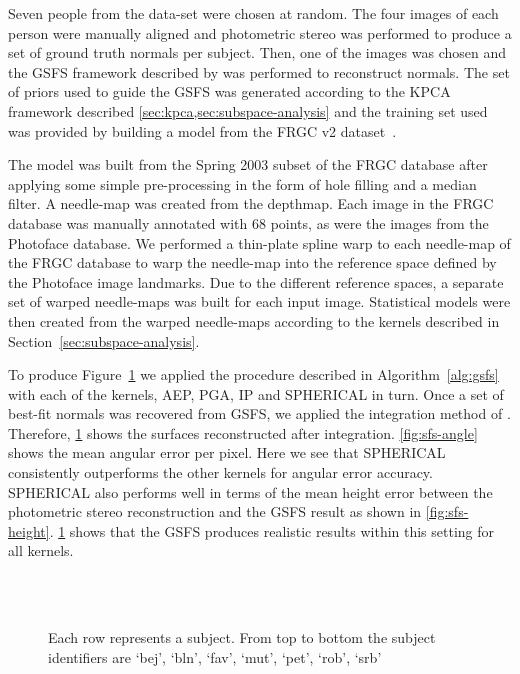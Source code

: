 Seven people from the data-set were chosen at random. The four images of each 
person were manually aligned and photometric stereo was performed to produce a
set of ground truth normals per subject. Then, one of the images was chosen 
and the GSFS framework described by \citet{RefWorks:86,RefWorks:90} 
was performed to reconstruct normals. The set of priors used to guide the GSFS 
was generated according to the KPCA framework described 
\cref{sec:kpca,sec:subspace-analysis} and the training set used was provided by 
building a model from the FRGC v2 dataset~\cite{RefWorks:251}.

The model was built from the Spring 2003 subset of the FRGC database after 
applying some simple pre-processing in the form of hole filling and a median 
filter. A needle-map was created from the depthmap. Each image in the FRGC 
database was manually annotated with 68 points, as were the images from the 
Photoface database. We performed a thin-plate spline warp to each needle-map 
of the FRGC database to warp the needle-map into the reference space defined 
by the Photoface image landmarks. Due to the different reference spaces, a 
separate set of warped needle-maps was built for each input image. Statistical 
models were then created from the warped needle-maps according to the kernels 
described in Section~\ref{sec:subspace-analysis}.

To produce Figure~\ref{fig:sfs-results} we applied the procedure described in 
Algorithm~\ref{alg:gsfs} with each of the kernels, AEP, PGA, IP and SPHERICAL 
in turn. Once a set of best-fit normals was recovered from GSFS, we applied 
the integration method of \citet{RefWorks:99}. 
Therefore, \cref{fig:sfs-results} shows the surfaces reconstructed 
after integration. \cref{fig:sfs-angle} shows the mean angular error 
per pixel. Here we see that SPHERICAL consistently outperforms the other 
kernels for angular error accuracy. SPHERICAL also performs well in terms of 
the mean height error between the photometric stereo reconstruction and the 
GSFS result as shown in \cref{fig:sfs-height}. \cref{fig:sfs-results} 
shows that the GSFS produces realistic results within this setting for all kernels.
\begin{figure}
    \centering
     \\
     \\
    \caption{Each row represents a subject. From top to bottom the subject 
             identifiers are `bej', `bln', `fav', `mut', `pet', `rob', `srb'}
\label{fig:sfs-results}
\end{figure}
